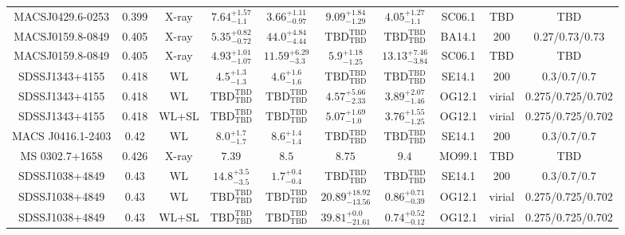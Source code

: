 \begin{table}
\begin{tabular}{cccccccccc}
MACSJ0429.6-0253 & 0.399 & X-ray & ${7.64}^{+1.57}_{-1.1}$ & ${3.66}^{+1.11}_{-0.97}$ & ${9.09}^{+1.84}_{-1.29}$ & ${4.05}^{+1.27}_{-1.1}$ & SC06.1 & TBD & TBD \\
MACSJ0159.8-0849 & 0.405 & X-ray & ${5.35}^{+0.82}_{-0.72}$ & ${44.0}^{+4.84}_{-4.44}$ & ${\mathrm{TBD}}^{\mathrm{TBD}}_{\mathrm{TBD}}$ & ${\mathrm{TBD}}^{\mathrm{TBD}}_{\mathrm{TBD}}$ & BA14.1 & 200 & 0.27/0.73/0.73 \\
MACSJ0159.8-0849 & 0.405 & X-ray & ${4.93}^{+1.01}_{-1.07}$ & ${11.59}^{+6.29}_{-3.3}$ & ${5.9}^{+1.18}_{-1.25}$ & ${13.13}^{+7.46}_{-3.84}$ & SC06.1 & TBD & TBD \\
SDSSJ1343+4155 & 0.418 & WL & ${4.5}^{+1.3}_{-1.3}$ & ${4.6}^{+1.6}_{-1.6}$ & ${\mathrm{TBD}}^{\mathrm{TBD}}_{\mathrm{TBD}}$ & ${\mathrm{TBD}}^{\mathrm{TBD}}_{\mathrm{TBD}}$ & SE14.1 & 200 & 0.3/0.7/0.7 \\
SDSSJ1343+4155 & 0.418 & WL & ${\mathrm{TBD}}^{\mathrm{TBD}}_{\mathrm{TBD}}$ & ${\mathrm{TBD}}^{\mathrm{TBD}}_{\mathrm{TBD}}$ & ${4.57}^{+5.66}_{-2.33}$ & ${3.89}^{+2.07}_{-1.46}$ & OG12.1 & virial & 0.275/0.725/0.702 \\
SDSSJ1343+4155 & 0.418 & WL+SL & ${\mathrm{TBD}}^{\mathrm{TBD}}_{\mathrm{TBD}}$ & ${\mathrm{TBD}}^{\mathrm{TBD}}_{\mathrm{TBD}}$ & ${5.07}^{+1.69}_{-1.0}$ & ${3.76}^{+1.55}_{-1.25}$ & OG12.1 & virial & 0.275/0.725/0.702 \\
MACS J0416.1-2403 & 0.42 & WL & ${8.0}^{+1.7}_{-1.7}$ & ${8.6}^{+1.4}_{-1.4}$ & ${\mathrm{TBD}}^{\mathrm{TBD}}_{\mathrm{TBD}}$ & ${\mathrm{TBD}}^{\mathrm{TBD}}_{\mathrm{TBD}}$ & SE14.1 & 200 & 0.3/0.7/0.7 \\
MS 0302.7+1658 & 0.426 & X-ray & ${7.39}^{}_{}$ & ${8.5}^{}_{}$ & ${8.75}^{}_{}$ & ${9.4}^{}_{}$ & MO99.1 & TBD & TBD \\
SDSSJ1038+4849 & 0.43 & WL & ${14.8}^{+3.5}_{-3.5}$ & ${1.7}^{+0.4}_{-0.4}$ & ${\mathrm{TBD}}^{\mathrm{TBD}}_{\mathrm{TBD}}$ & ${\mathrm{TBD}}^{\mathrm{TBD}}_{\mathrm{TBD}}$ & SE14.1 & 200 & 0.3/0.7/0.7 \\
SDSSJ1038+4849 & 0.43 & WL & ${\mathrm{TBD}}^{\mathrm{TBD}}_{\mathrm{TBD}}$ & ${\mathrm{TBD}}^{\mathrm{TBD}}_{\mathrm{TBD}}$ & ${20.89}^{+18.92}_{-13.56}$ & ${0.86}^{+0.71}_{-0.39}$ & OG12.1 & virial & 0.275/0.725/0.702 \\
SDSSJ1038+4849 & 0.43 & WL+SL & ${\mathrm{TBD}}^{\mathrm{TBD}}_{\mathrm{TBD}}$ & ${\mathrm{TBD}}^{\mathrm{TBD}}_{\mathrm{TBD}}$ & ${39.81}^{+0.0}_{-21.61}$ & ${0.74}^{+0.52}_{-0.12}$ & OG12.1 & virial & 0.275/0.725/0.702 \\

\end{tabular}
\end{table}

